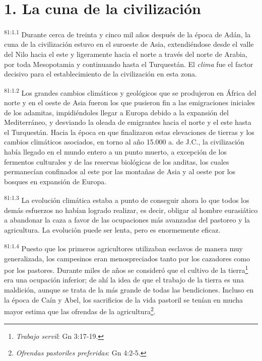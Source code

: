 \documentclass[twoside, 11pt]{book}
\begin{document}
\section*{1. La cuna de la civilización}
\par
\textsuperscript{81:1.1} Durante cerca de treinta y cinco mil años después de la época de Adán, la cuna de la civilización estuvo en el suroeste de Asia, extendiéndose desde el valle del Nilo hacia el este y ligeramente hacia el norte a través del norte de Arabia, por toda Mesopotamia y continuando hasta el Turquestán. El \textit{clima} fue el factor decisivo para el establecimiento de la civilización en esta zona.

\par
\textsuperscript{81:1.2} Los grandes cambios climáticos y geológicos que se produjeron en África del norte y en el oeste de Asia fueron los que pusieron fin a las emigraciones iniciales de los adamitas, impidiéndoles llegar a Europa debido a la expansión del Mediterráneo, y desviando la oleada de emigrantes hacia el norte y el este hasta el Turquestán. Hacia la época en que finalizaron estas elevaciones de tierras y los cambios climáticos asociados, en torno al año 15.000 a. de J.C., la civilización había llegado en el mundo entero a un punto muerto, a excepción de los fermentos culturales y de las reservas biológicas de los anditas, los cuales permanecían confinados al este por las montañas de Asia y al oeste por los bosques en expansión de Europa.

\par
\textsuperscript{81:1.3} La evolución climática estaba a punto de conseguir ahora lo que todos los demás esfuerzos no habían logrado realizar, es decir, obligar al hombre eurasiático a abandonar la caza a favor de las ocupaciones más avanzadas del pastoreo y la agricultura. La evolución puede ser lenta, pero es enormemente eficaz.

\par
\textsuperscript{81:1.4} Puesto que los primeros agricultores utilizaban esclavos de manera muy generalizada, los campesinos eran menospreciados tanto por los cazadores como por los pastores. Durante miles de años se consideró que el cultivo de la tierra\footnote{\textit{Trabajo servil}: Gn 3:17-19.} era una ocupación inferior; de ahí la idea de que el trabajo de la tierra es una maldición, aunque se trata de la más grande de todas las bendiciones. Incluso en la época de Caín y Abel, los sacrificios de la vida pastoril se tenían en mucha mayor estima que las ofrendas de la agricultura\footnote{\textit{Ofrendas pastoriles preferidas}: Gn 4:2-5.}.
\end{document}
